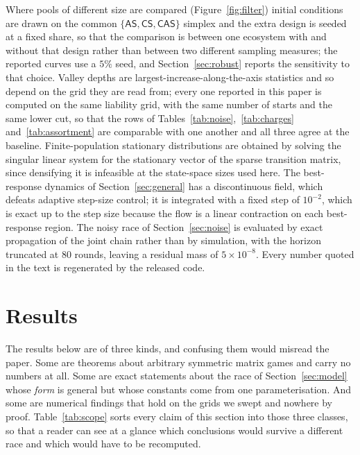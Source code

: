 \documentclass[11pt,a4paper]{article}
\theoremstyle{definition}
\newcommand{\AS}{\textsf{AS}}
\newcommand{\CS}{\textsf{CS}}
\newcommand{\CAS}{\textsf{CAS}}
\begin{document}
Where pools of different size are compared
(Figure~\ref{fig:filter}) initial conditions are drawn on the common
$\{\AS,\CS,\CAS\}$ simplex and the extra design is seeded at a fixed share, so
that the comparison is between one ecosystem with and without that design
rather than between two different sampling measures; the reported curves use a
$5\%$ seed, and Section~\ref{sec:robust} reports the sensitivity to that
choice. Valley depths are largest-increase-along-the-axis statistics and so
depend on the grid they are read from; every one reported in this paper is
computed on the same liability grid, with the same number of starts and the
same lower cut, so that the rows of
Tables~\ref{tab:noise},~\ref{tab:charges} and~\ref{tab:assortment} are
comparable with one another and all three agree at the baseline.
Finite-population stationary distributions are obtained by solving the
singular linear system for the stationary vector of the sparse transition
matrix, since densifying it is infeasible at the state-space sizes used here.
The best-response dynamics of Section~\ref{sec:general} has a discontinuous
field, which defeats adaptive step-size control; it is integrated with a fixed
step of $10^{-2}$, which is exact up to the step size because the flow is a
linear contraction on each best-response region. The noisy race of
Section~\ref{sec:noise} is evaluated by exact propagation of the joint chain
rather than by simulation, with the horizon truncated at $80$ rounds, leaving
a residual mass of $5\times10^{-8}$. Every number quoted in the text is
regenerated by the released code.

\section{Results}\label{sec:results}

The results below are of three kinds, and confusing them would misread the
paper. Some are theorems about arbitrary symmetric matrix games and carry no
numbers at all. Some are exact statements about the race of
Section~\ref{sec:model} whose \emph{form} is general but whose constants come
from one parameterisation. And some are numerical findings that hold on the
grids we swept and nowhere by proof. Table~\ref{tab:scope} sorts every claim
of this section into those three classes, so that a reader can see at a glance
which conclusions would survive a different race and which would have to be
recomputed.
\end{document}
